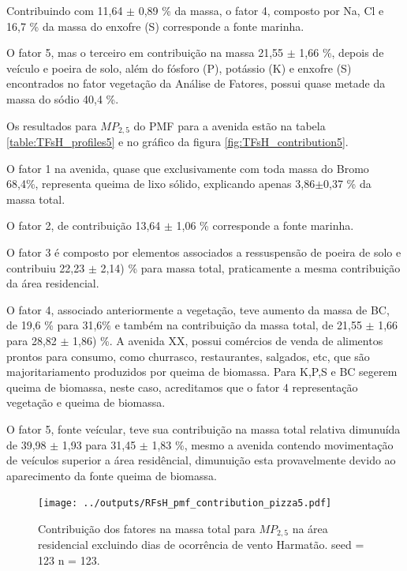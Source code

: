 Contribuindo com 11,64 $\pm$ 0,89 \% da massa, o fator 4, composto por Na, Cl e
16,7 \% da massa do enxofre (S) corresponde a fonte marinha. 

O fator 5, mas o terceiro em contribuição na massa 21,55 $\pm$ 1,66 \%, depois
de veículo e poeira de solo, além do fósforo (P), potássio (K) e enxofre (S) 
encontrados no fator vegetação da Análise de Fatores, possui quase metade da 
massa do sódio 40,4 \%.

Os resultados para $MP_{2,5}$ do PMF para a avenida estão na tabela 
\ref{table:TFsH_profiles5} e no gráfico da figura \ref{fig:TFsH_contribution5}.

O fator 1 na avenida, quase que exclusivamente com toda massa do Bromo 68,4\%,
representa queima de lixo sólido, explicando apenas 3,86$\pm$0,37 \% da massa 
total.  

O fator 2, de contribuição 13,64 $\pm$ 1,06 \% corresponde a fonte marinha. 

O fator 3 é composto por elementos associados a ressuspensão de poeira de 
solo e contribuiu 22,23 $\pm$ 2,14) \% para massa total, praticamente
a mesma contribuição da área residencial. 

O fator 4, associado anteriormente a vegetação, teve aumento da massa de BC, 
de 19,6 \% para 31,6\% e também na contribuição da massa total, 
de 21,55 $\pm$ 1,66 para 28,82 $\pm$ 1,86) \%. A avenida XX, possui comércios
de venda de alimentos prontos para consumo, como churrasco, restaurantes, 
salgados, etc, que são majoritariamento produzidos por queima de biomassa. 
Para \citet{reid2005} K,P,S e BC segerem queima de biomassa, neste caso, 
acreditamos que o fator 4 representação vegetação e queima de biomassa.   

O fator 5, fonte veícular, teve sua contribuição na massa total relativa 
dimunuída de 39,98 $\pm$ 1,93 para 31,45 $\pm$ 1,83 \%, mesmo a avenida contendo 
movimentação de veículos superior a área residêncial,
dimunuição esta provavelmente devido ao aparecimento da fonte queima de biomassa. 

\begin{landscape}
  \begin{figure}
    \centering
    \begin{minipage}[b]{0.45\linewidth}
      \texttt{[image: ../outputs/RFsH\_pmf\_contribution\_pizza5.pdf]}
      \caption{Contribuição dos fatores na massa total para $MP_{2,5}$ na área
               residencial excluindo dias de ocorrência de vento Harmatão. seed = 123 n = 123.
               \label{fig:RFsH_contribution5}}
    \end{minipage}%
    \hspace{0.5cm}
    \begin{minipage}[b]{0.45\linewidth}
      
    \end{minipage}
  \end{figure}
\end{landscape}

